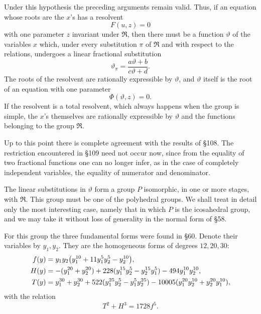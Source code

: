 \documentclass[11pt,a4paper]{book}
\begin{document}
Under this hypothesis the preceding arguments remain valid.  Thus, if an equation whose roots are the $x$'s has a resolvent
\begin{equation}
 F(u,z)=0
\end{equation}
with one parameter $z$ invariant under $\mathfrak R$, then there must be a function $\vartheta$ of the variables $x$ which, under every substitution $\pi$ of $\mathfrak R$ and with respect to the relations, undergoes a linear fractional substitution
\begin{equation}
 \vartheta_\pi=\frac{a\vartheta+b}{c\vartheta+d}.
\end{equation}
The roots of the resolvent are rationally expressible by $\vartheta$, and $\vartheta$ itself is the root of an equation with one parameter
\begin{equation}
 \Phi(\vartheta,z)=0.
\end{equation}
If the resolvent is a total resolvent, which always happens when the group is simple, the $x$'s themselves are rationally expressible by $\vartheta$ and the functions belonging to the group $\mathfrak R$.

Up to this point there is complete agreement with the results of \S 108.  The restriction encountered in \S 109 need not occur now, since from the equality of two fractional functions one can no longer infer, as in the case of completely independent variables, the equality of numerator and denominator.

The linear substitutions in $\vartheta$ form a group $P$ isomorphic, in one or more stages, with $\mathfrak R$.  This group must be one of the polyhedral groups.  We shall treat in detail only the most interesting case, namely that in which $P$ is the icosahedral group, and we may take it without loss of generality in the normal form of \S 58.

For this group the three fundamental forms were found in \S 60.  Denote their variables by $y_1,y_2$.  They are the homogeneous forms of degrees $12,20,30$:
\begin{align}
 f(y)&=y_1y_2\bigl(y_1^{10}+11y_1^5y_2^5-y_2^{10}\bigr),\notag\\
 H(y)&=-(y_1^{20}+y_2^{20})+228(y_1^{15}y_2^5-y_2^{15}y_1^5)-494y_1^{10}y_2^{10},\notag\\
 T(y)&=y_1^{30}+y_2^{30}+522(y_1^{25}y_2^5-y_1^5y_2^{25})
      -10005(y_1^{20}y_2^{10}+y_2^{20}y_1^{10}),
\end{align}
with the relation
\begin{equation}
 T^2+H^3=1728f^5.
\end{equation}
\end{document}
